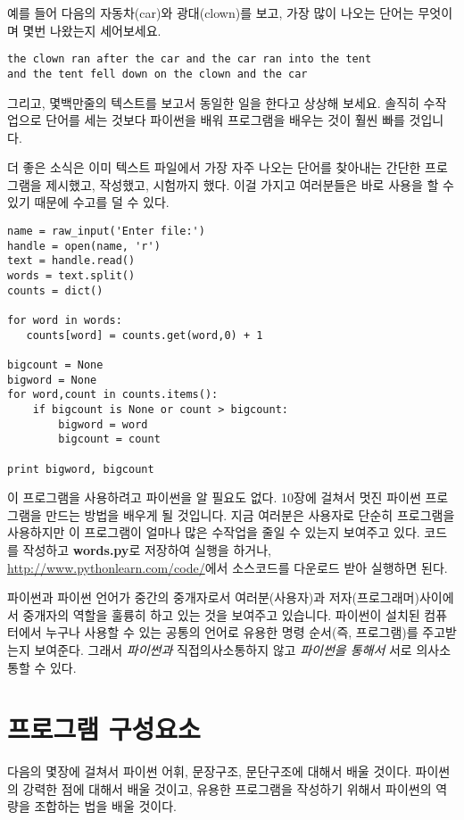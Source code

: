 예를 들어 다음의 자동차(car)와 광대(clown)를 보고, 가장 많이 나오는 단어는 무엇이며 몇번 나왔는지 세어보세요.

\beforeverb
\begin{verbatim}
the clown ran after the car and the car ran into the tent 
and the tent fell down on the clown and the car 
\end{verbatim}
\afterverb
%

그리고, 몇백만줄의 텍스트를 보고서 동일한 일을 한다고 상상해 보세요. 솔직히 수작업으로 단어를 세는 것보다 파이썬을 배워 프로그램을 배우는 것이 훨씬 빠를 것입니다.

더 좋은 소식은 이미 텍스트 파일에서 가장 자주 나오는 단어를 찾아내는 간단한 프로그램을 제시했고, 작성했고, 시험까지 했다. 이걸 가지고 여러분들은 바로 사용을 할 수 있기 때문에 수고를 덜 수 있다.

\beforeverb
\begin{verbatim}
name = raw_input('Enter file:')
handle = open(name, 'r')
text = handle.read()
words = text.split()
counts = dict()

for word in words:
   counts[word] = counts.get(word,0) + 1

bigcount = None
bigword = None
for word,count in counts.items():
    if bigcount is None or count > bigcount:
        bigword = word
        bigcount = count

print bigword, bigcount
\end{verbatim}
\afterverb
%
이 프로그램을 사용하려고 파이썬을 알 필요도 없다. 10장에 걸쳐서 멋진 파이썬 프로그램을 만드는 방법을 배우게 될 것입니다. 지금 여러분은 사용자로 단순히 프로그램을 사용하지만 이 프로그램이 얼마나 많은 수작업을 줄일 수 있는지 보여주고 있다. 코드를 작성하고 {\bf words.py}로 저장하여 실행을 하거나, \url{http://www.pythonlearn.com/code/}에서 소스코드를 다운로드 받아 실행하면 된다.

파이썬과 파이썬 언어가 중간의 중개자로서 여러분(사용자)과 저자(프로그래머)사이에서 중개자의 역할을 훌륭히 하고 있는 것을 보여주고 있습니다. 파이썬이 설치된 컴퓨터에서 누구나 사용할 수 있는 공통의 언어로 유용한 명령 순서(즉, 프로그램)를 주고받는지 보여준다. 그래서 {\em 파이썬과} 직접의사소통하지 않고 {\em 파이썬을 통해서} 서로 의사소통할 수 있다.

\section{프로그램 구성요소}

다음의 몇장에 걸쳐서 파이썬 어휘, 문장구조, 문단구조에 대해서 배울 것이다. 파이썬의 강력한 점에 대해서 배울 것이고, 유용한 프로그램을 작성하기 위해서 파이썬의 역량을 조합하는 법을 배울 것이다.

